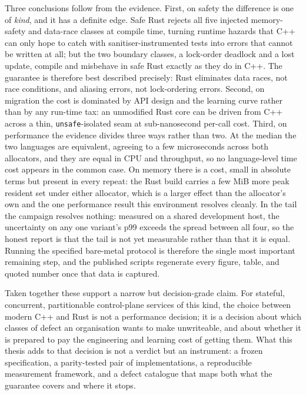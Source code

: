 \documentclass[english,twoside,openright,a4paper,censored,csm,software-track-2020]{HYthesisML}
\begin{document}
Three conclusions follow from the evidence. First, on safety the difference is one of
\emph{kind}, and it has a definite edge. Safe Rust rejects all five injected memory-safety and
data-race classes at compile time, turning runtime hazards that C++ can only hope to catch with
sanitiser-instrumented tests into errors that cannot be written at all; but the two boundary
classes, a lock-order deadlock and a lost update, compile and misbehave in safe Rust exactly as
they do in C++. The guarantee is therefore best described precisely: Rust eliminates data
races, not race conditions, and aliasing errors, not lock-ordering errors. Second, on migration
the cost is dominated by API design and the learning curve rather than by any run-time tax: an
unmodified Rust core can be driven from C++ across a thin, \texttt{unsafe}-isolated seam at
sub-nanosecond per-call cost. Third, on performance the evidence divides three ways rather than
two. At the median the two languages are equivalent, agreeing to a few microseconds across both
allocators, and they are equal in CPU and throughput, so no language-level time cost appears in
the common case. On memory there is a cost, small in absolute terms but present in every
repeat: the Rust build carries a few MiB more peak resident set under either allocator, which
is a larger effect than the allocator's own and the one performance result this environment
resolves cleanly. In the tail the campaign resolves nothing:
measured on a shared development host, the uncertainty on any one variant's p99 exceeds the
spread between all four, so the honest report is that the tail is not yet measurable rather
than that it is equal. Running the specified bare-metal protocol is therefore the single most
important remaining step, and the published scripts regenerate every figure, table, and quoted
number once that data is captured.

Taken together these support a narrow but decision-grade claim. For stateful, concurrent,
partitionable control-plane services of this kind, the choice between modern C++ and Rust is
not a performance decision; it is a decision about which classes of defect an organisation
wants to make unwriteable, and about whether it is prepared to pay the engineering and
learning cost of getting them. What this thesis adds to that decision is not a verdict but an
instrument: a frozen specification, a parity-tested pair of implementations, a reproducible
measurement framework, and a defect catalogue that maps both what the guarantee covers and
where it stops.
\end{document}
